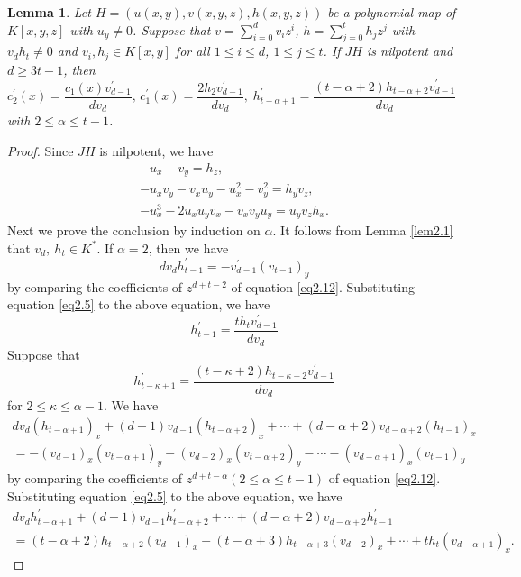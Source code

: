 \documentclass[12pt, twoside, leqno]{article}
\newtheorem{lem}[thm]{Lemma}
\theoremstyle{definition}
\numberwithin{equation}{section}
\begin{document}
\begin{lem}\label{lem2.2}
Let $H=(u(x,y),v(x,y,z),h(x,y,z))$ be a polynomial map of $K[x,y,z]$ with $u_y\neq 0$.
Suppose that $v=\sum_{i=0}^dv_iz^i$, $h=\sum_{j=0}^th_jz^j$ with $v_dh_t\neq 0$ and $v_i, h_j\in K[x,y]$ for all $1\leq i\leq d$, $1\leq j\leq t$. If $JH$ is nilpotent and $d\geq 3t-1$, then
$c_{2}^{'}(x)=\dfrac{c_{1}(x)v_{d-1}^{'}}{dv_{d}},\,c_{1}^{'}(x)=\dfrac{2h_{2}v_{d-1}^{'}}{dv_{d}},\;h_{t-\alpha+1}^{'}=\dfrac{(t-\alpha+2)h_{t-\alpha+2}v_{d-1}^{'}}{dv_{d}}$
with $2\leq \alpha\leq t-1$.
\end{lem}
\begin{proof}
Since $JH$ is nilpotent, we have
\begin{eqnarray}
-u_{x}-v_{y}=h_{z},\label{eq2.21}\\
-u_{x}v_{y}-v_{x}u_{y}-u_{x}^{2}-v_{y}^{2}=h_{y}v_{z},\label{eq2.22}\\
-u_{x}^{3}-2u_{x}u_{y}v_{x}-v_{x}v_{y}u_{y}=u_{y}v_{z}h_{x}.\label{eq2.23}
\end{eqnarray}
Next we prove the conclusion by induction on $\alpha$. It follows from Lemma \ref{lem2.1} that $v_d,~h_t\in K^*$. If $\alpha=2$, then we have
$$dv_{d}h_{t-1}^{'}=-v_{d-1}^{'}(v_{t-1})_y$$
by comparing the coefficients of $z^{d+t-2}$ of equation \eqref{eq2.12}. Substituting equation \eqref{eq2.5} to the above equation, we have
\begin{equation}\label{eq2.24}
h_{t-1}^{'}=\frac{th_{t}v_{d-1}^{'}}{dv_{d}}
\end{equation}
Suppose that
\begin{equation}\label{eq2.25}
h_{t-\kappa+1}^{'}=\dfrac{(t-\kappa+2)h_{t-\kappa+2}v_{d-1}^{'}}{dv_{d}}
\end{equation}
for $2\leq \kappa\leq \alpha-1$. We have
\begin{equation}\nonumber
\begin{split}
dv_{d}(h_{t-\alpha+1})_x+(d-1)v_{d-1}(h_{t-\alpha+2})_x+\cdots+(d-\alpha+2)v_{d-\alpha+2}(h_{t-1})_x\\=-(v_{d-1})_x(v_{t-\alpha+1})_y-(v_{d-2})_x(v_{t-\alpha+2})_y-\cdots-(v_{d-\alpha+1})_x(v_{t-1})_y
\end{split}
\end{equation}
by comparing the coefficients of $z^{d+t-\alpha}$$(2\leq\alpha\leq t-1)$ of equation \eqref{eq2.12}.
Substituting equation \eqref{eq2.5} to the above equation, we have
\begin{equation}\label{eq2.26}
\begin{split}
dv_{d}h_{t-\alpha+1}^{'}+(d-1)v_{d-1}h_{t-\alpha+2}^{'}+\cdots+(d-\alpha+2)v_{d-\alpha+2}h_{t-1}^{'}\\=(t-\alpha+2)h_{t-\alpha+2}(v_{d-1})_x+(t-\alpha+3)h_{t-\alpha+3}(v_{d-2})_x+\cdots+th_{t}(v_{d-\alpha+1})_x.

\end{split}
\end{equation}$$
\end{proof}
\end{document}
